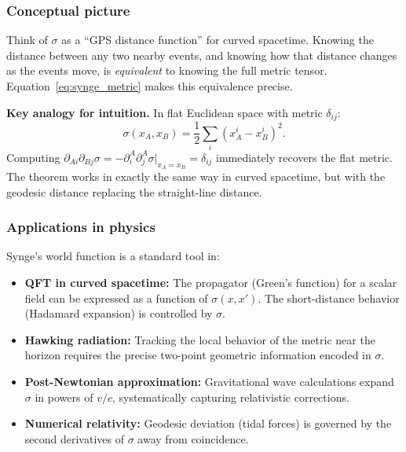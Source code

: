 \documentclass[12pt,letterpaper]{article}
\begin{document}
\subsubsection{Conceptual picture}

Think of $\sigma$ as a ``GPS distance function'' for curved spacetime.
Knowing the distance between any two nearby events, and knowing how that distance
changes as the events move, is \emph{equivalent} to knowing the full metric tensor.
Equation~\eqref{eq:synge_metric} makes this equivalence precise.

\begin{mdframed}[style=bluebox]
\textbf{Key analogy for intuition.}
In flat Euclidean space with metric $\delta_{ij}$:
\[
\sigma(x_A, x_B) = \frac{1}{2}\sum_i (x_A^i - x_B^i)^2.
\]
Computing $\partial_{Ai}\partial_{Bj}\sigma = -\partial_i^A\partial_j^A\sigma\big|_{x_A=x_B}
= \delta_{ij}$ immediately recovers the flat metric.
The theorem works in exactly the same way in curved spacetime, but with the geodesic
distance replacing the straight-line distance.
\end{mdframed}

\subsubsection{Applications in physics}

Synge's world function is a standard tool in:
\begin{itemize}[leftmargin=2em]
  \item \textbf{QFT in curved spacetime:}
        The propagator (Green's function) for a scalar field can be expressed as a
        function of $\sigma(x, x')$. The short-distance behavior (Hadamard expansion)
        is controlled by $\sigma$.
  \item \textbf{Hawking radiation:}
        Tracking the local behavior of the metric near the horizon requires the
        precise two-point geometric information encoded in $\sigma$.
  \item \textbf{Post-Newtonian approximation:}
        Gravitational wave calculations expand $\sigma$ in powers of $v/c$,
        systematically capturing relativistic corrections.
  \item \textbf{Numerical relativity:}
        Geodesic deviation (tidal forces) is governed by the second derivatives
        of $\sigma$ away from coincidence.
\end{itemize}

\end{document}

